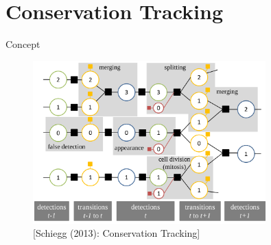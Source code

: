 \section{Conservation Tracking}

\begin{frame}{Concept}
    \begin{figure}
        \centering
        \includegraphics[width=0.8\textwidth]{images/conservation/factor_graph_big3.png}
        \caption{[Schiegg \etal (2013): Conservation Tracking]}
    \end{figure}
\end{frame}

